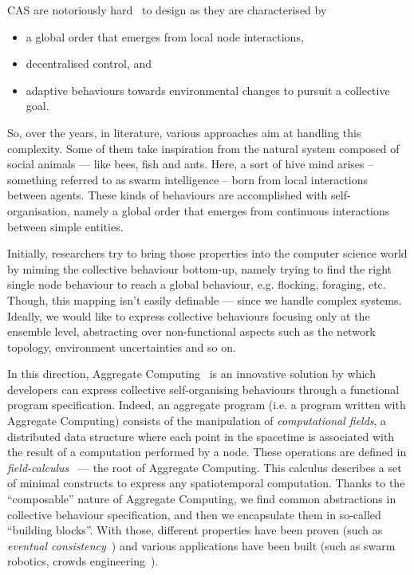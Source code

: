 \documentclass[conference]{IEEEtran}
\begin{document}
CAS are notoriously hard~\cite{DBLP:conf/huc/Ferscha15} to design as they are characterised by 
\begin{itemize}
\item a global order that emerges from local node interactions, 
\item decentralised control, and 
\item adaptive behaviours towards environmental changes to pursuit a collective goal.
\end{itemize} 
%
So, over the years, in literature, various approaches aim at handling this complexity. 
%
Some of them take inspiration from the natural system
 composed of social animals --- like bees, fish and ants. 
%
Here, a sort of hive mind arises -- 
 something referred to as swarm intelligence -- 
born from local interactions between agents. 
%
These kinds of behaviours are accomplished with self-organisation, 
 namely a global order that emerges from continuous 
 interactions between simple entities.

Initially, researchers try to bring those properties into the computer science world 
 by miming the collective behaviour bottom-up, 
 namely trying to find the right single node behaviour 
 to reach a global behaviour, e.g. flocking, foraging, etc.
%
Though, this mapping isn't easily definable ---
 since we handle complex systems.
%
Ideally, we would like to express collective behaviours focusing only at the ensemble level,
 abstracting over non-functional aspects such as the network topology, environment uncertainties and 
 so on.

In this direction, Aggregate Computing~\cite{DBLP:journals/computer/BealPV15} is an innovative solution by which 
 developers can express collective self-organising behaviours through a functional program specification.
%
Indeed, an aggregate program (i.e. a program written with Aggregate Computing) consists of the manipulation of \textit{computational fields}, a distributed
 data structure where each point in the spacetime is associated with the result of a computation
 performed by a node.
%
These operations are defined in \textit{field-calculus}~\cite{DBLP:conf/coordination/AudritoBDV18} --- the root of Aggregate Computing. 
 This calculus describes a set of minimal constructs to express any spatiotemporal computation.
%
Thanks to the ``composable'' nature of Aggregate Computing, we find common abstractions 
 in collective behaviour specification, and then we encapsulate them in so-called ``building blocks''.
%
With those, different properties have been proven (such as \textit{eventual consistency}~\cite{DBLP:journals/taas/BealVPD17}) and various
 applications have been built (such as swarm robotics, crowds engineering~\cite{DBLP:journals/eaai/CasadeiVAPD21}).
\end{document}
